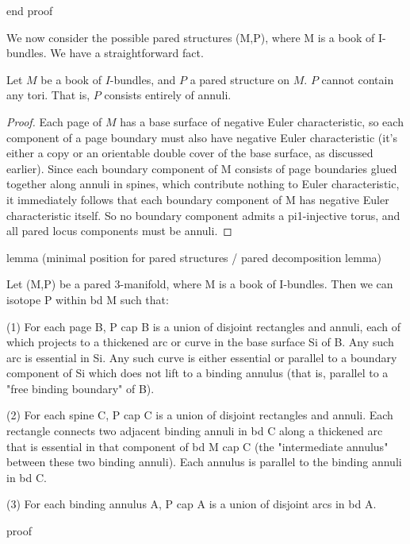 end proof

We now consider the possible pared structures (M,P), where M is a book of
I-bundles. We have a straightforward fact.

\begin{prop}

Let $M$ be a book of $I$-bundles, and $P$ a pared structure on $M$. $P$ cannot
contain any tori.  That is, $P$ consists entirely of annuli.

\end{prop}

\begin{proof}

Each page of $M$ has a base surface of negative Euler characteristic, so each
component of a page boundary must also have negative Euler characteristic (it's
either a copy or an orientable double cover of the base surface, as discussed
earlier). Since each boundary component of M consists of page boundaries glued
together along annuli in spines, which contribute nothing to Euler
characteristic, it immediately follows that each boundary component of M has
negative Euler characteristic itself. So no boundary component admits
a pi1-injective torus, and all pared locus components must be annuli.

\end{proof}

lemma (minimal position for pared structures / pared decomposition lemma)

Let (M,P) be a pared 3-manifold, where M is a book of I-bundles. Then we can
isotope P within bd M such that:

(1) For each page B, P cap B is a union of disjoint rectangles and annuli, each
of which projects to a thickened arc or curve in the base surface Si of B. Any
such arc is essential in Si. Any such curve is either essential or parallel to
a boundary component of Si which does not lift to a binding annulus (that is,
parallel to a "free binding boundary" of B).

(2) For each spine C, P cap C is a union of disjoint rectangles and annuli.
Each rectangle connects two adjacent binding annuli in bd C along a thickened
arc that is essential in that component of bd M cap C (the "intermediate
annulus" between these two binding annuli). Each annulus is parallel to the
binding annuli in bd C.

(3) For each binding annulus A, P cap A is a union of disjoint arcs in bd A.

proof

